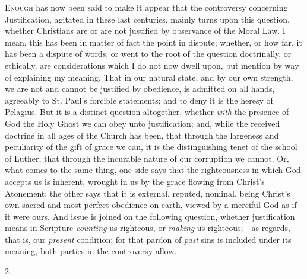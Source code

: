 
E\textsc{nough} has now been said to make it appear that the
controversy concerning Justification, agitated in these last
centuries, mainly turns upon this question, whether Christians are or
are not justified by observance of the Moral Law. I mean, this has
been in matter of fact the point in dispute; whether, or how far, it
has been a dispute of words, or went to the root of the question
doctrinally, or ethically, are considerations which I do not now dwell
upon, but mention by way of explaining my meaning. That in our natural
state, and by our own strength, we are not and cannot be justified by
obedience, is admitted on all hands, agreeably to St. Paul's forcible
statements; and to deny it is the heresy of Pelagius. But it is a
distinct question altogether, whether \emph{with} the presence of God
the Holy Ghost we can obey unto justification; and, while the received
doctrine in all ages of the Church has been, that through the
largeness and peculiarity of the gift of grace we can, it is the
distinguishing tenet of the school of Luther, that through the
incurable nature of our corruption we cannot. Or, what comes to the
same thing, one side says that the righteousness in which God accepts
us is inherent, wrought in us by the grace flowing from Christ's
Atonement; the other says that it is external, reputed, nominal, being
Christ's own sacred and most perfect obedience on earth, viewed by a
merciful God as if it were ours. And issue is joined on the following
question, whether justification means in Scripture \emph{counting} us
righteous, or \emph{making} us righteous;—as regards, that is, our \emph{present}
condition; for that pardon of \emph{past} sins is included under its
meaning, both parties in the controversy allow.

2.

